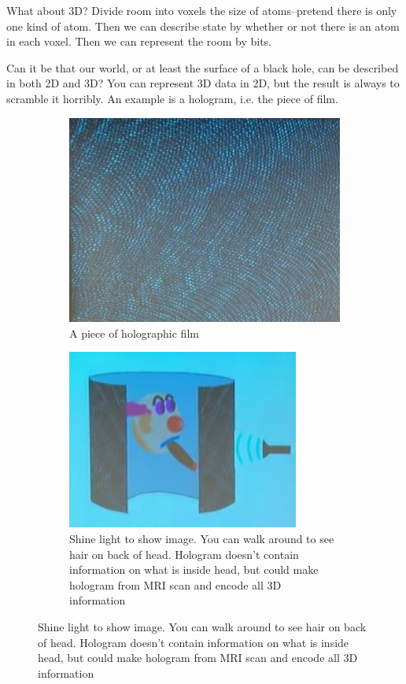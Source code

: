 \documentclass[]{article}
\begin{document}
What about 3D? Divide room into voxels the size of atoms--pretend there is only one kind of atom. Then we can describe state by whether or not there is an atom in each voxel. Then we can represent the room by bits.

Can it be that our world, or at least the surface of a black hole, can be described in both 2D and 3D? You can represent 3D data in 2D, but the result is always to scramble it horribly. An example is a hologram, i.e. the piece of film.

\begin{figure}[H]
	\caption[Hologram compresses image from 3D to 2D]{Hologram compresses image from 3D to 2D, but also scrambles it beyond recognition--unless you know detailed code.}
	\begin{subfigure}[t]{0.45\textwidth}
		\caption{A piece of holographic film}
		\includegraphics[width=\textwidth]{wh-holographic-film}
	\end{subfigure}
	\;
	\begin{subfigure}[t]{0.45\textwidth}
		\caption{Shine light to show image. You can walk around to see hair on back of head. Hologram doesn't contain information on what is inside head, but could make hologram from MRI scan and encode all 3D information}
		\includegraphics[width=\textwidth]{wh-3d-image}
	\end{subfigure}
\end{figure}
\end{document}
